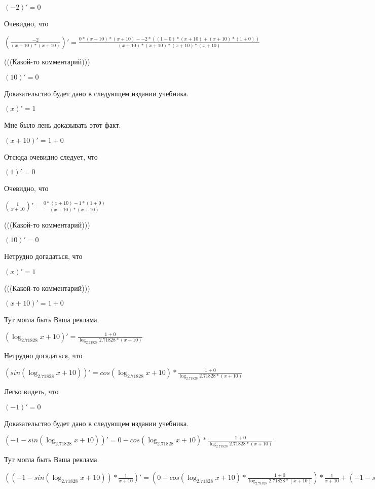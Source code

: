 \documentclass[12pt,a4paper,fleqn]{article}
\theoremstyle{definition}
\begin{document}
$( -2 )' =  0 $

Очевидно, что

$(\frac{ -2 }{( x  +  10 ) * ( x  +  10 )}
)' = \frac{ 0  * ( x  +  10 ) * ( x  +  10 ) -  -2  * (( 1  +  0 ) * ( x  +  10 ) + ( x  +  10 ) * ( 1  +  0 ))}{( x  +  10 ) * ( x  +  10 ) * ( x  +  10 ) * ( x  +  10 )}
$

(((Какой-то комментарий)))

$( 10 )' =  0 $

Доказательство будет дано в следующем издании учебника.

$( x )' =  1 $

Мне было лень доказывать этот факт.

$( x  +  10 )' =  1  +  0 $

Отсюда очевидно следует, что

$( 1 )' =  0 $

Очевидно, что

$(\frac{ 1 }{ x  +  10 }
)' = \frac{ 0  * ( x  +  10 ) -  1  * ( 1  +  0 )}{( x  +  10 ) * ( x  +  10 )}
$

(((Какой-то комментарий)))

$( 10 )' =  0 $

Нетрудно догадаться, что

$( x )' =  1 $

(((Какой-то комментарий)))

$( x  +  10 )' =  1  +  0 $

Тут могла быть Ваша реклама.

$(\log_{ 2.71828 }{ x  +  10 })' = \frac{ 1  +  0 }{\log_{ 2.71828 }{ 2.71828 } * ( x  +  10 )}
$

Нетрудно догадаться, что

$(sin(\log_{ 2.71828 }{ x  +  10 }))' = cos(\log_{ 2.71828 }{ x  +  10 }) * \frac{ 1  +  0 }{\log_{ 2.71828 }{ 2.71828 } * ( x  +  10 )}
$

Легко видеть, что

$( -1 )' =  0 $

Доказательство будет дано в следующем издании учебника.

$( -1  - sin(\log_{ 2.71828 }{ x  +  10 }))' =  0  - cos(\log_{ 2.71828 }{ x  +  10 }) * \frac{ 1  +  0 }{\log_{ 2.71828 }{ 2.71828 } * ( x  +  10 )}
$

Тут могла быть Ваша реклама.

$(( -1  - sin(\log_{ 2.71828 }{ x  +  10 })) * \frac{ 1 }{ x  +  10 }
)' = ( 0  - cos(\log_{ 2.71828 }{ x  +  10 }) * \frac{ 1  +  0 }{\log_{ 2.71828 }{ 2.71828 } * ( x  +  10 )}
) * \frac{ 1 }{ x  +  10 }
 + ( -1  - sin(\log_{ 2.71828 }{ x  +  10 })) * \frac{ 0  * ( x  +  10 ) -  1  * ( 1  +  0 )}{( x  +  10 ) * ( x  +  10 )}
$
\end{document}
